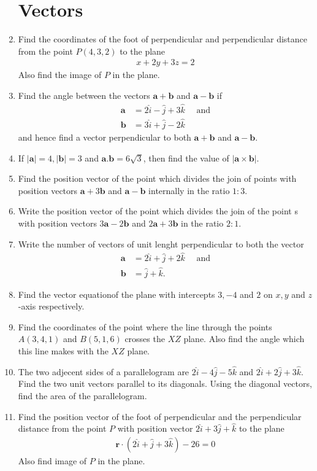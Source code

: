 \documentclass[12pt,-letter paper]{article}
\let\vec\mathbf{}
\let\vec\mathbf{}
\let\vec\mathbf{}
\theoremstyle{remark}
\providecommand{\brak}[1]{\ensuremath{\left(#1\right)}}
\providecommand{\abs}[1]{\left\vert#1\right\vert}
\begin{document}
\begin{enumerate}
            \section{Vectors}
      \item Find the coordinates of the foot of perpendicular and perpendicular distance from the point $P\brak{4, 3, 2}$ to the plane
            \begin{align*}
                  x+2y+3z=2
            \end{align*}
            Also find the image of $P$ in the plane.
      \item Find the angle between the vectors $\vec{a} + \vec{b}$ and $\vec{a}-\vec{b}$ if
            \begin{align*}
                  \vec{a} & =2\hat{i}-\hat{j}+3\hat{k} \quad \text{ and} \\
                  \vec{b} & = 3\hat{i} + \hat{j} -2\hat{k}
            \end{align*}
            and hence find a vector perpendicular to both $\vec{a}+\vec{b}$ and $\vec{a}-\vec{b}$.
      \item If  $\abs{\vec{a}} = 4 , \abs{\vec{b}}=3$  and $\vec{a}.\vec{b}=6\sqrt{3}$, then find the value of $\abs{\vec{a}\times \vec{b}}$.
      \item Find the position vector of the point which divides the join of points with position vectors $\vec{a}+3\vec{b}$ and $\vec{a}-\vec{b}$ internally in the ratio $1:3$.
      \item Write the position vector of the point which divides the join of the point s with position vectors $3\vec{a} - 2\vec{b}$ and $2\vec{a} + 3\vec{b}$ in the ratio $2:1$.
      \item Write the number of vectors of unit lenght perpendicular to both the vector
            \begin{align*}
                  \vec{a} & = 2 \hat{i} + \hat{j} +2\hat{k} \quad\text{ and} \\
                  \vec{b} & = \hat{j}+\hat{k}.
            \end{align*}
      \item Find the vector equationof the plane with intercepts $3,-4$ and $2$ on $x,y$ and  $z$-axis respectively.
      \item Find the coordinates of the point where the line through the points $A\brak{3,4,1}$ and $B\brak{5,1,6}$ crosses the $XZ$ plane. Also find the angle which this line makes with the $XZ$ plane.
      \item The two adjecent sides of a parallelogram are $2\hat{i}-4\hat{j}-5\hat{k}$ and $2\hat{i}+2\hat{j}+3\hat{k}$. Find the two unit vectors parallel to its diagonals. Using the diagonal vectors, find the area of the parallelogram.
      \item Find the position vector of the foot of perpendicular and the perpendicular distance from the point $P$ with position vector $2\hat{i}+3\hat{j}+\hat{k}$ to the plane
            \begin{align*}
                  \vec{r}\cdot\brak{2\hat{i}+\hat{j}+3\hat{k}} - 26=0
            \end{align*}
            Also find image of $P$ in the plane.

\end{enumerate}
\end{document}
